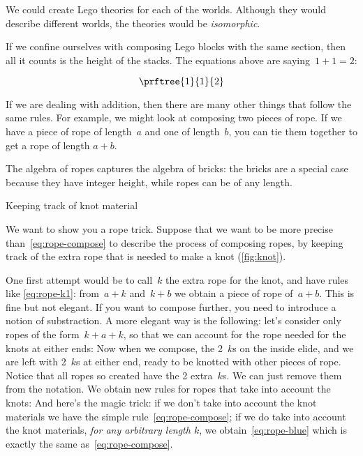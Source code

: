 We could create Lego theories for each of the worlds. Although they would describe different worlds, the theories would be \emph{isomorphic}.

If we confine ourselves with composing Lego blocks with the same section, then all it counts is the height of the stacks.
The equations above are saying~$1+1=2$:

\begin{equation}
    \prftree{1}{1}{2}
\end{equation}

If we are dealing with addition, then there are many other things that follow the same rules.
For example, we might look at composing two pieces of rope. If we have a piece of rope of length~$a$ and one of length~$b$, you can tie them together to get a rope of length $a+b$.


The algebra of ropes captures the algebra of bricks: the bricks are a special case because they have integer height, while ropes can be of any length.
\begin{marginfigure}
    \caption{Keeping track of knot material}
    \label{fig:knot}
\end{marginfigure}


We want to show you a rope trick.
Suppose that we want to be more precise than~\cref{eq:rope-compose} to describe the process of composing ropes, by keeping track of the extra rope that is needed to make a knot (\cref{fig:knot}).


One first attempt would be to call~$k$ the extra rope for the knot, and have rules like \cref{eq:rope-k1}: from~$a + k$ and~$k + b$ we obtain a piece of rope of~$a+b$.
%
% 
%
This is fine but not elegant.
If you want to compose further, you need to introduce a notion of substraction.
%
%
A more elegant way is the following: let's consider only ropes of the form~$k + a + k$, so that we can account for the rope needed for the knots at either ends:
%
%
Now when we compose, the 2~$k$s on the inside elide, and we are left with 2~$k$s at either end, ready to be knotted with other pieces of rope.
Notice that all ropes so created have the 2 extra~$k$s.
We can just remove them from the notation. We obtain new rules for ropes that take into account the knots:
%
%
And here's the magic trick: if we don't take into account the knot materials we have the simple rule~\cref{eq:rope-compose}; if we do take into account the knot materials, \emph{for any arbitrary length $k$}, we obtain~\cref{eq:rope-blue} which is exactly the same as~\cref{eq:rope-compose}.

